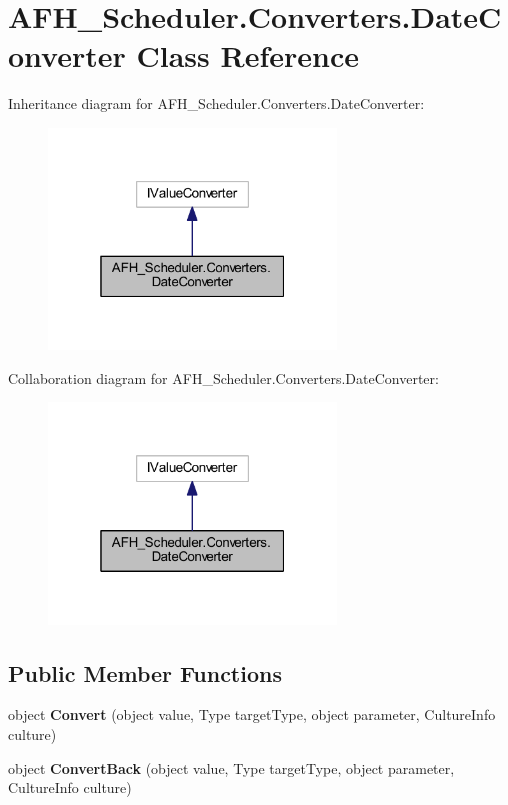 \section{A\+F\+H\+\_\+\+Scheduler.\+Converters.\+Date\+Converter Class Reference}
\label{class_a_f_h___scheduler_1_1_converters_1_1_date_converter}


Inheritance diagram for A\+F\+H\+\_\+\+Scheduler.\+Converters.\+Date\+Converter\+:
\nopagebreak
\begin{figure}[H]
\begin{center}
\leavevmode
\includegraphics[width=217pt]{class_a_f_h___scheduler_1_1_converters_1_1_date_converter__inherit__graph}
\end{center}
\end{figure}


Collaboration diagram for A\+F\+H\+\_\+\+Scheduler.\+Converters.\+Date\+Converter\+:
\nopagebreak
\begin{figure}[H]
\begin{center}
\leavevmode
\includegraphics[width=217pt]{class_a_f_h___scheduler_1_1_converters_1_1_date_converter__coll__graph}
\end{center}
\end{figure}
\subsection*{Public Member Functions}
\begin{DoxyCompactItemize}
\item 
object \textbf{ Convert} (object value, Type target\+Type, object parameter, Culture\+Info culture)
\item 
object \textbf{ Convert\+Back} (object value, Type target\+Type, object parameter, Culture\+Info culture)
\end{DoxyCompactItemize}


